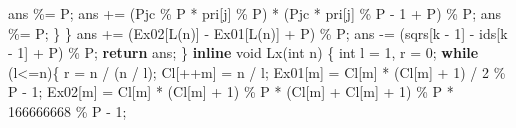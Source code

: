 \documentclass[
]{article}
\newenvironment{Shaded}{}{}
\newcommand{\ControlFlowTok}[1]{\textcolor[rgb]{0.00,0.44,0.13}{\textbf{#1}}}
\newcommand{\DataTypeTok}[1]{\textcolor[rgb]{0.56,0.13,0.00}{#1}}
\newcommand{\DecValTok}[1]{\textcolor[rgb]{0.25,0.63,0.44}{#1}}
\newcommand{\KeywordTok}[1]{\textcolor[rgb]{0.00,0.44,0.13}{\textbf{#1}}}
\newcommand{\NormalTok}[1]{#1}
\newcommand{\OperatorTok}[1]{\textcolor[rgb]{0.40,0.40,0.40}{#1}}
\begin{document}
\begin{Shaded}
\begin{Highlighting}[]
\NormalTok{                ans }\OperatorTok{\%=}\NormalTok{ P}\OperatorTok{;}
\NormalTok{                ans }\OperatorTok{+=} \OperatorTok{(}\NormalTok{Pjc }\OperatorTok{\%}\NormalTok{ P }\OperatorTok{*}\NormalTok{ pri}\OperatorTok{[}\NormalTok{j}\OperatorTok{]} \OperatorTok{\%}\NormalTok{ P}\OperatorTok{)} \OperatorTok{*} \OperatorTok{(}\NormalTok{Pjc }\OperatorTok{*}\NormalTok{ pri}\OperatorTok{[}\NormalTok{j}\OperatorTok{]} \OperatorTok{\%}\NormalTok{ P }\OperatorTok{{-}} \DecValTok{1} \OperatorTok{+}\NormalTok{ P}\OperatorTok{)} \OperatorTok{\%}\NormalTok{ P}\OperatorTok{;}
\NormalTok{                ans }\OperatorTok{\%=}\NormalTok{ P}\OperatorTok{;}
            \OperatorTok{\}}
        \OperatorTok{\}}
\NormalTok{        ans }\OperatorTok{+=} \OperatorTok{(}\NormalTok{Ex02}\OperatorTok{[}\NormalTok{L}\OperatorTok{(}\NormalTok{n}\OperatorTok{)]} \OperatorTok{{-}}\NormalTok{ Ex01}\OperatorTok{[}\NormalTok{L}\OperatorTok{(}\NormalTok{n}\OperatorTok{)]} \OperatorTok{+}\NormalTok{ P}\OperatorTok{)} \OperatorTok{\%}\NormalTok{ P}\OperatorTok{;}
\NormalTok{        ans }\OperatorTok{{-}=} \OperatorTok{(}\NormalTok{sqrs}\OperatorTok{[}\NormalTok{k }\OperatorTok{{-}} \DecValTok{1}\OperatorTok{]} \OperatorTok{{-}}\NormalTok{ ids}\OperatorTok{[}\NormalTok{k }\OperatorTok{{-}} \DecValTok{1}\OperatorTok{]} \OperatorTok{+}\NormalTok{ P}\OperatorTok{)} \OperatorTok{\%}\NormalTok{ P}\OperatorTok{;}
        \ControlFlowTok{return}\NormalTok{ ans}\OperatorTok{;}
    \OperatorTok{\}}
    \KeywordTok{inline} \DataTypeTok{void}\NormalTok{ Lx}\OperatorTok{(}\DataTypeTok{int}\NormalTok{ n}\OperatorTok{)}
    \OperatorTok{\{}
        \DataTypeTok{int}\NormalTok{ l }\OperatorTok{=} \DecValTok{1}\OperatorTok{,}\NormalTok{ r }\OperatorTok{=} \DecValTok{0}\OperatorTok{;}
        \ControlFlowTok{while} \OperatorTok{(}\NormalTok{l}\OperatorTok{\textless{}=}\NormalTok{n}\OperatorTok{)\{}
\NormalTok{            r }\OperatorTok{=}\NormalTok{ n }\OperatorTok{/} \OperatorTok{(}\NormalTok{n }\OperatorTok{/}\NormalTok{ l}\OperatorTok{);}
\NormalTok{            Cl}\OperatorTok{[++}\NormalTok{m}\OperatorTok{]} \OperatorTok{=}\NormalTok{ n }\OperatorTok{/}\NormalTok{ l}\OperatorTok{;}
\NormalTok{            Ex01}\OperatorTok{[}\NormalTok{m}\OperatorTok{]} \OperatorTok{=}\NormalTok{ Cl}\OperatorTok{[}\NormalTok{m}\OperatorTok{]} \OperatorTok{*} \OperatorTok{(}\NormalTok{Cl}\OperatorTok{[}\NormalTok{m}\OperatorTok{]} \OperatorTok{+} \DecValTok{1}\OperatorTok{)} \OperatorTok{/} \DecValTok{2} \OperatorTok{\%}\NormalTok{ P }\OperatorTok{{-}} \DecValTok{1}\OperatorTok{;}
\NormalTok{            Ex02}\OperatorTok{[}\NormalTok{m}\OperatorTok{]} \OperatorTok{=}\NormalTok{ Cl}\OperatorTok{[}\NormalTok{m}\OperatorTok{]} \OperatorTok{*} \OperatorTok{(}\NormalTok{Cl}\OperatorTok{[}\NormalTok{m}\OperatorTok{]} \OperatorTok{+} \DecValTok{1}\OperatorTok{)} \OperatorTok{\%}\NormalTok{ P }\OperatorTok{*} \OperatorTok{(}\NormalTok{Cl}\OperatorTok{[}\NormalTok{m}\OperatorTok{]} \OperatorTok{+}\NormalTok{ Cl}\OperatorTok{[}\NormalTok{m}\OperatorTok{]} \OperatorTok{+} \DecValTok{1}\OperatorTok{)} \OperatorTok{\%}\NormalTok{ P }\OperatorTok{*} \DecValTok{166666668} \OperatorTok{\%}\NormalTok{ P }\OperatorTok{{-}} \DecValTok{1}\OperatorTok{;}

\end{Highlighting}
\end{Shaded}
\end{document}
